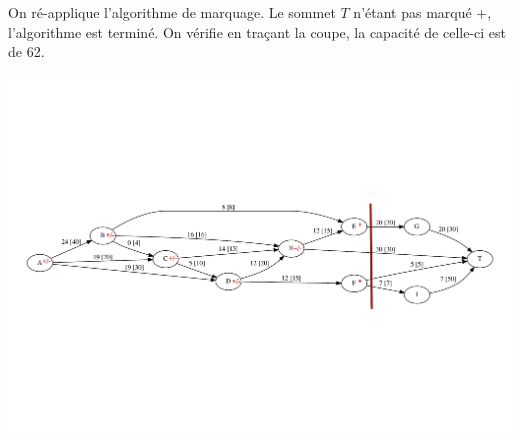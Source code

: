 \begin{frame}{}
    On ré-applique l'algorithme de marquage. Le sommet $T$ n'étant pas marqué +, l'algorithme est terminé. On vérifie en traçant la coupe, la capacité de celle-ci est de 62.

    \begin{center}
        \includegraphics[width=\textwidth]{tutorials/pcc/figs/reseau-6m.pdf}
    \end{center}
   
\end{frame}

